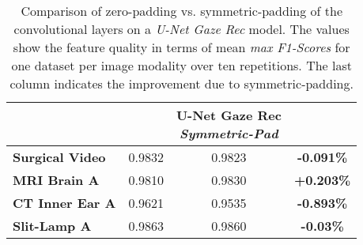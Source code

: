 \begin{table}[!htbp]
   \centering
   \caption[Zero vs. symmetric padding]{Comparison of zero-padding vs. symmetric-padding of the convolutional layers on a \textit{U-Net Gaze Rec} model. The values show the feature quality in terms of mean \textit{max F1-Scores} for one dataset per image modality over ten repetitions. The last column indicates the improvement due to symmetric-padding.}
   \small
   \begin{tabular}{l|c|c||c|}
      \toprule
       & \Gape[6pt][6pt]{\rotatebox[origin=cB]{90}{\parbox[t]{2.6cm}{U-Net Gaze Rec \\ \textit{\textbf{Zero-Pad}\hspace*{\fill}}}}}
       & \rotatebox[origin=cB]{90}{\parbox[t]{2.6cm}{U-Net Gaze Rec \\ \textit{\textbf{Symmetric-Pad}\hspace*{\fill}}}}
       & \rotatebox[origin=cB]{90}{\parbox[t]{2.6cm}{\textbf{Improvement\hspace*{\fill}}}} \\
      \midrule
      \textbf{Surgical Video} & 0.9832 & 0.9823  & \textbf{-0.091\%} \\\midrule
      \textbf{MRI Brain A} & 0.9810 & 0.9830 &  \textbf{+0.203\%} \\\midrule
      \textbf{CT Inner Ear A} & 0.9621 & 0.9535 & \textbf{-0.893\%} \\\midrule
      \textbf{Slit-Lamp A} & 0.9863 & 0.9860 & \textbf{-0.03\%} \\
      \bottomrule
   \end{tabular}
   \label{tab:zero_vs_sym_padd}
\end{table}

